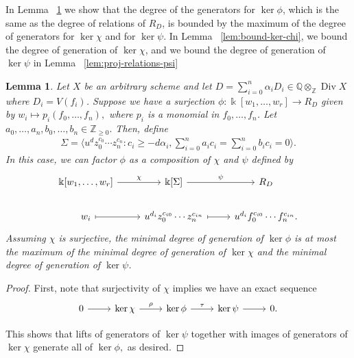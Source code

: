 \documentclass{amsart}
\theoremstyle{plain}
\newtheorem{lem}[thm]{Lemma}
\theoremstyle{definition}
\theoremstyle{remark}
\numberwithin{equation}{section}
\newcommand\bq{{\mathbb Q}}
\newcommand\bz{{\mathbb Z}}
\newcommand\bk{{\Bbbk}}
\DeclareMathOperator\di{Div}
\newcommand\bida{a}
\newcommand\bidb{b}
\begin{document}
In Lemma ~\ref{lem:composite-map} we show that the degree of the
generators for $\ker \phi$, which is the same as the degree of relations
of $R_D$, is bounded by the maximum of the degree of generators for
$\ker \chi$ and for $\ker \psi$.
In Lemma ~\ref{lem:bound-ker-chi}, we bound the degree of generation of
$\ker \chi $, and we bound the degree of generation of $\ker \psi$ in Lemma ~\ref{lem:proj-relations-psi}

\begin{lem}
\label{lem:composite-map}
Let $X$ be an arbitrary scheme and let $D = \sum_{i=0}^{n}\alpha_i D_i\in \bq \otimes_\bz \di X$ where $D_i = V(f_i)$. Suppose we have a
surjection $\phi\colon \bk[w_1,\ldots, w_r] \rightarrow R_D$ given by $w_i
\mapsto p_i(f_0, \ldots, f_n),$ where $p_i$ is a monomial in $f_0,\ldots, f_n$.
Let $\bida_0, \ldots, \bida_n, \bidb_0, \ldots, \bidb_n \in \bz_{\geq 0}.$
Then, define
\begin{align*}
	\Sigma = \langle u^d z_0^{c_0} \cdots z_n^{c_n} : c_i \geq -d \alpha_i, \sum_{i=0}^{n} \bida_i c_i = \sum_{i=0}^{n} \bidb_i c_i = 0 \rangle. 
\end{align*}
In this case, we can factor $\phi$ as a composition of $\chi$ and $\psi$ defined by
\[
\begin{tikzcd}
\bk[w_1,\ldots, w_r] \ar {r}{\chi} & \bk[\Sigma] \ar {r}{\psi} & R_D \\
w_i \arrow[mapsto]{r} & u^{d_i}z_0^{c_{i0}} \cdots z_n^{c_{in}} \arrow[mapsto]{r} & u^{d_i}f_0^{c_{i0}} \cdots f_n^{c_{in}}.
\end{tikzcd}
\]
Assuming $\chi$ is surjective, the minimal degree of generation of $\ker \phi$
is at most the maximum of the minimal degree of generation of $\ker \chi$ and
the minimal degree of generation of $\ker \psi$.
\end{lem}

\begin{proof}
First, note that surjectivity of $\chi$ implies we have an exact sequence
\[
\begin{tikzcd}
0 \ar {r} & \ker \chi \ar{r}{\rho} & \ker \phi \ar {r}{\tau} & \ker \psi \ar r & 0.
\end{tikzcd}
\]

This shows that lifts of generators of $\ker \psi$ together with images of
generators of $\ker \chi$ generate all of $\ker \phi,$ as desired. 
\end{proof}
\end{document}
